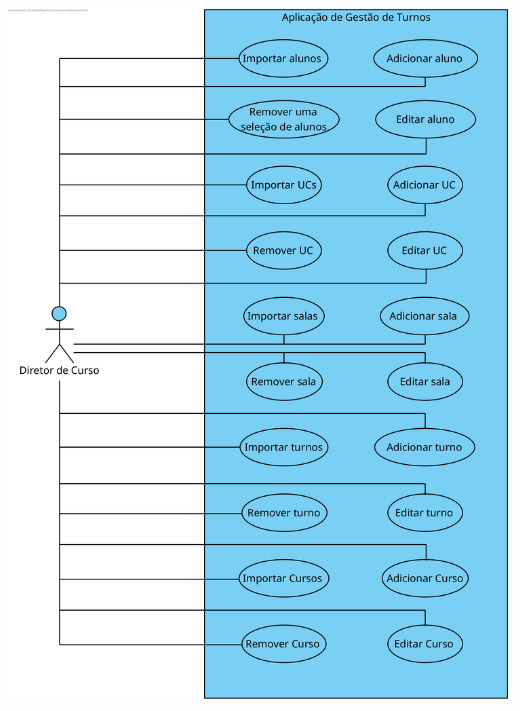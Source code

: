 \documentclass[a4paper,12pt]{scrreprt}
\begin{document}
\begin{minipage}{\textwidth}
    \centering
    \includegraphics[width=1\textwidth]{images/use-cases/diagrams/2-gestao-alunos-cursos-ucs-turnos-salas.png}
    \label{fig:2-2-diagrama_de_casos_de_uso_gestao_de_alunos_cursos_ucs_turnos_e_salas}
\end{minipage}
\end{document}
